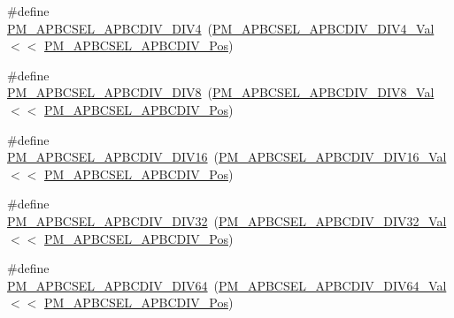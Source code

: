 \begin{DoxyCompactItemize}
\item 
\#define \mbox{\hyperlink{group___s_a_m_d21___p_m_ga3edf3ca1800b707a9d47ebbbdf7b3cc4}{P\+M\+\_\+\+A\+P\+B\+C\+S\+E\+L\+\_\+\+A\+P\+B\+C\+D\+I\+V\+\_\+\+D\+I\+V4}}~(\mbox{\hyperlink{group___s_a_m_d21___p_m_ga7b652bc91ccaa93868364c00af432d6d}{P\+M\+\_\+\+A\+P\+B\+C\+S\+E\+L\+\_\+\+A\+P\+B\+C\+D\+I\+V\+\_\+\+D\+I\+V4\+\_\+\+Val}}   $<$$<$ \mbox{\hyperlink{group___s_a_m_d21___p_m_ga4a8379c87e542ce1f35e688187aac873}{P\+M\+\_\+\+A\+P\+B\+C\+S\+E\+L\+\_\+\+A\+P\+B\+C\+D\+I\+V\+\_\+\+Pos}})
\item 
\#define \mbox{\hyperlink{group___s_a_m_d21___p_m_ga1c923d46b1569a1d56f639f42f61237c}{P\+M\+\_\+\+A\+P\+B\+C\+S\+E\+L\+\_\+\+A\+P\+B\+C\+D\+I\+V\+\_\+\+D\+I\+V8}}~(\mbox{\hyperlink{group___s_a_m_d21___p_m_gace5dfb40f2f3fdef3a50e0b02053b19f}{P\+M\+\_\+\+A\+P\+B\+C\+S\+E\+L\+\_\+\+A\+P\+B\+C\+D\+I\+V\+\_\+\+D\+I\+V8\+\_\+\+Val}}   $<$$<$ \mbox{\hyperlink{group___s_a_m_d21___p_m_ga4a8379c87e542ce1f35e688187aac873}{P\+M\+\_\+\+A\+P\+B\+C\+S\+E\+L\+\_\+\+A\+P\+B\+C\+D\+I\+V\+\_\+\+Pos}})
\item 
\#define \mbox{\hyperlink{group___s_a_m_d21___p_m_gaf9c8dfca842134a6ad6e72fb31e8d7f8}{P\+M\+\_\+\+A\+P\+B\+C\+S\+E\+L\+\_\+\+A\+P\+B\+C\+D\+I\+V\+\_\+\+D\+I\+V16}}~(\mbox{\hyperlink{group___s_a_m_d21___p_m_ga6fe64d54976c1ae20f5e280b0b70db29}{P\+M\+\_\+\+A\+P\+B\+C\+S\+E\+L\+\_\+\+A\+P\+B\+C\+D\+I\+V\+\_\+\+D\+I\+V16\+\_\+\+Val}}  $<$$<$ \mbox{\hyperlink{group___s_a_m_d21___p_m_ga4a8379c87e542ce1f35e688187aac873}{P\+M\+\_\+\+A\+P\+B\+C\+S\+E\+L\+\_\+\+A\+P\+B\+C\+D\+I\+V\+\_\+\+Pos}})
\item 
\#define \mbox{\hyperlink{group___s_a_m_d21___p_m_ga1bbe6e70ee588f9d8b0bcf194eda31cd}{P\+M\+\_\+\+A\+P\+B\+C\+S\+E\+L\+\_\+\+A\+P\+B\+C\+D\+I\+V\+\_\+\+D\+I\+V32}}~(\mbox{\hyperlink{group___s_a_m_d21___p_m_ga833c9559062ca281577ab653e32fc9a8}{P\+M\+\_\+\+A\+P\+B\+C\+S\+E\+L\+\_\+\+A\+P\+B\+C\+D\+I\+V\+\_\+\+D\+I\+V32\+\_\+\+Val}}  $<$$<$ \mbox{\hyperlink{group___s_a_m_d21___p_m_ga4a8379c87e542ce1f35e688187aac873}{P\+M\+\_\+\+A\+P\+B\+C\+S\+E\+L\+\_\+\+A\+P\+B\+C\+D\+I\+V\+\_\+\+Pos}})
\item 
\#define \mbox{\hyperlink{group___s_a_m_d21___p_m_ga6106cad1c61024bcc240678d6904d47e}{P\+M\+\_\+\+A\+P\+B\+C\+S\+E\+L\+\_\+\+A\+P\+B\+C\+D\+I\+V\+\_\+\+D\+I\+V64}}~(\mbox{\hyperlink{group___s_a_m_d21___p_m_ga4dc1ccebf7e7d88b71527d7b02c159e2}{P\+M\+\_\+\+A\+P\+B\+C\+S\+E\+L\+\_\+\+A\+P\+B\+C\+D\+I\+V\+\_\+\+D\+I\+V64\+\_\+\+Val}}  $<$$<$ \mbox{\hyperlink{group___s_a_m_d21___p_m_ga4a8379c87e542ce1f35e688187aac873}{P\+M\+\_\+\+A\+P\+B\+C\+S\+E\+L\+\_\+\+A\+P\+B\+C\+D\+I\+V\+\_\+\+Pos}})
$$
\end{DoxyCompactItemize}
